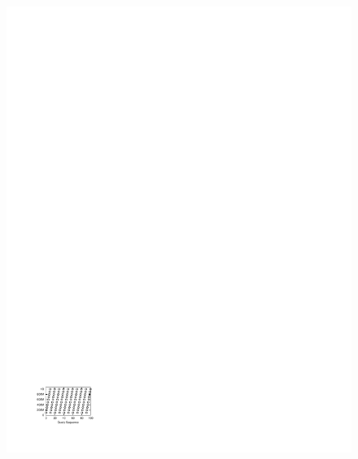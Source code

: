 \begin{figure}[t]
\begin{center}
{           \includegraphics[trim=2cm 2cm 16.3cm 24cm]{Figures/holistic/periodic_predicates}
        }%
       \subfloat[Sequential]{%
            \label{fig:sequential_pred}
}
\end{center}
\end{figure}
